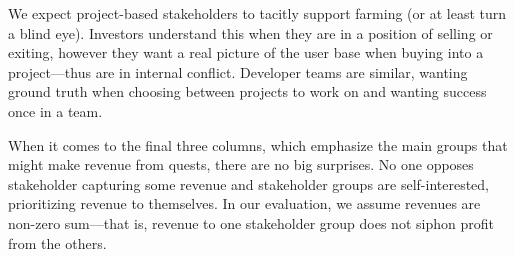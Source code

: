 We expect project-based stakeholders to tacitly support farming (or at least turn a blind eye). Investors understand this when they are in a position of selling or exiting, however they want a real picture of the user base when buying into a project---thus are in internal conflict. Developer teams are similar, wanting ground truth when choosing between projects to work on and wanting success once in a team. 

When it comes to the final three columns, which emphasize the main groups that might make revenue from quests, there are no big surprises. No one opposes stakeholder capturing some revenue and stakeholder groups are self-interested, prioritizing revenue to themselves. In our evaluation, we assume revenues are non-zero sum---that is, revenue to one stakeholder group does not siphon profit from the others.


